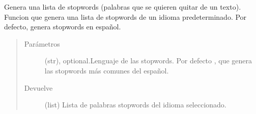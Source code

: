 \documentclass[letterpaper,10pt,openany,spanish]{sphinxmanual}
\begin{document}

\begin{fulllineitems}
\label{\detokenize{funciones/limpieza:limpieza.lista_stopwords}}
Genera una lista de stopwords (palabras que se quieren quitar de un texto).     Funcion que genera una lista de stopwords de un idioma predeterminado.     Por defecto, genera stopwords en español.
\begin{quote}\begin{description}
\item[{Parámetros}] \leavevmode
{} \textendash{} (str), optional.Lenguaje de las stopwords. Por defecto , que         genera las stopwords más comunes del español.

\item[{Devuelve}] \leavevmode
(list) Lista de palabras stopwords del idioma seleccionado.

\end{description}\end{quote}

\end{fulllineitems}

\end{document}
